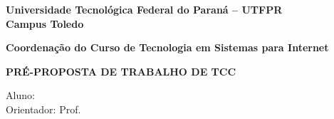 
\begin{titlepage}
	
	\begin{center}
	\Large	\textbf{Universidade Tecnológica Federal do Paraná – UTFPR}\\
	\textbf{Campus Toledo}
	\end{center}
	\begin{center}
		\textbf{Coordenação do Curso de Tecnologia em Sistemas para Internet}
	\end{center}
	
	\vspace{7\baselineskip}
	
	\def\curso#1{\gdef\@curso{#1}}
	\makeatletter
	\begin{center}
		\large \textbf{PRÉ-PROPOSTA DE TRABALHO DE TCC}
	\end{center}	
	\vspace{1\baselineskip plus 1.5\baselineskip minus 0.5\baselineskip}
	\begin{center}
		{\large\MakeUppercase\@titulo}
	\end{center}


	\vfill%
	
	Aluno: \@author\\
	
	Orientador: Prof. \@profTitulo\ \@orientador 
	
	\vspace{5\baselineskip}
	
	\begin{center}
		\textbf{\@cidade}\\
		\textbf{\anovalor}
	\end{center}
\restoregeometry

\end{titlepage}